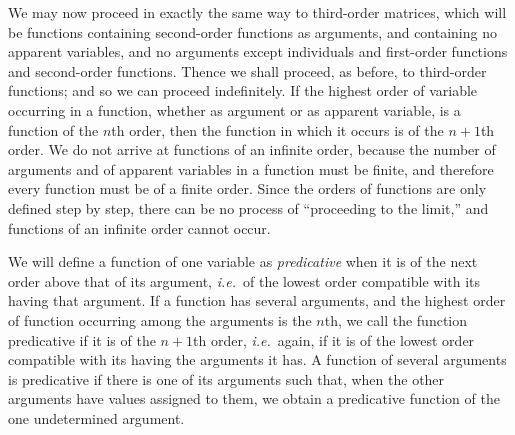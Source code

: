 \documentclass[letterpaper,12pt,openany,leqno]{book}
\newcommand{\pagefirst}[1]{\marginnote[\boxed{\text{#1}}]{\boxed{\text{#1}}}}
\begin{document}
\pagefirst{56} We may now proceed in exactly the same way to third-order matrices, which will be functions containing second-order functions as arguments, and containing no apparent variables, and no arguments except individuals and first-order functions and second-order functions. Thence we shall proceed, as before, to third-order functions; and so we can proceed indefinitely. If the highest order of variable occurring in a function, whether as argument or as apparent variable, is a function of the $n$th order, then the function in which it occurs is of the $n+1$th order. We do not arrive at functions of an infinite order, because the number of arguments and of apparent variables in a function must be finite, and therefore every function must be of a finite order. Since the orders of functions are only defined step by step, there can be no process of ``proceeding to the limit,'' and functions of an infinite order cannot occur.

We will define a function of one variable as \textit{predicative} when it is of the next order above that of its argument, \textit{i.e.}\ of the lowest order compatible with its having that argument. If a function has several arguments, and the highest order of function occurring among the arguments is the $n$th, we call the function predicative if it is of the $n+1$th order, \textit{i.e.}\ again, if it is of the lowest order compatible with its having the arguments it has. A function of several arguments is predicative if there is one of its arguments such that, when the other arguments have values assigned to them, we obtain a predicative function of the one undetermined argument.
\end{document}
